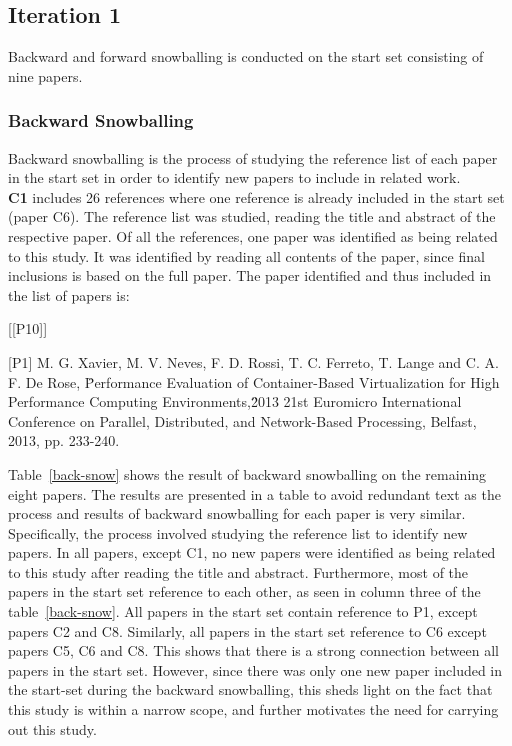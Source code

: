 \subsection{Iteration 1}
Backward and forward snowballing is conducted on the start set consisting of nine papers. 

\subsubsection{Backward Snowballing}
Backward snowballing is the process of studying the reference list of each paper in the start set in order to identify new papers to include in related work. \\

\textbf{C1} includes 26 references where one reference is already included in the start set (paper C6). The reference list was studied, reading the title and abstract of the respective paper. Of all the references, one paper was identified as being related to this study. It was identified by reading all contents of the paper, since final inclusions is based on the full paper. The paper identified and thus included in the list of papers is: \\

\begin{labeling}{[{[}P10{]}]}
\item [{[}P1{]}]  M. G. Xavier, M. V. Neves, F. D. Rossi, T. C. Ferreto, T. Lange and C. A. F. De Rose, \"Performance Evaluation of Container-Based Virtualization for High Performance Computing Environments,\" 2013 21st Euromicro International Conference on Parallel, Distributed, and Network-Based Processing, Belfast, 2013, pp. 233-240.
\item
\end{labeling}

Table~\ref{back-snow} shows the result of backward snowballing on the remaining eight papers. The results are presented in a table to avoid redundant text as the process and results of backward snowballing for each paper is very similar. Specifically, the process involved studying the reference list to identify new papers. In all papers, except C1, no new papers were identified as being related to this study after reading the title and abstract. Furthermore, most of the papers in the start set reference to each other, as seen in column three of the table~\ref{back-snow}. All papers in the start set contain reference to P1, except papers C2 and C8. Similarly, all papers in the start set reference to C6 except papers C5, C6 and C8. This shows that there is a strong connection between all papers in the start set. However, since there was only one new paper included in the start-set during the backward snowballing, this sheds light on the fact that this study is within a narrow scope, and further motivates the need for carrying out this study. 

